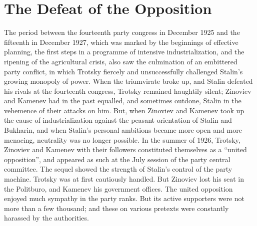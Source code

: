 \chapter{The Defeat of the Opposition}

The period between the fourteenth party congress in December 1925 and the fifteenth in December 1927, which was marked by the beginnings of effective planning, the first steps in a programme of intensive industrialization, and the ripening of the agricultural crisis, also saw the culmination of an embittered party conflict, in which Trotsky fiercely and unsuccessfully challenged Stalin's growing monopoly of power. When the triumvirate broke up, and Stalin defeated his rivals at the fourteenth congress, Trotsky remained haughtily silent; Zinoviev and Kamenev had in the past equalled, and sometimes outdone, Stalin in the vehemence of their attacks on him. But, when Zinoviev and Kamenev took up the cause of industrialization against the peasant orientation of Stalin and Bukharin, and when Stalin's personal ambitions became more open and more menacing, neutrality was no longer possible. In the summer of 1926, Trotsky, Zinoviev and Kamenev with their followers constituted themselves as a ``united opposition'', and appeared as such at the July session of the party central committee. The sequel showed the strength of Stalin's control of the party machine. Trotsky was at first cautiously handled. But Zinoviev lost his seat in the Politburo, and Kamenev his government offices. The united opposition enjoyed much sympathy in the party ranks. But its active supporters were not more than a few thousand; and these on various pretexts were constantly harassed by the authorities. 

